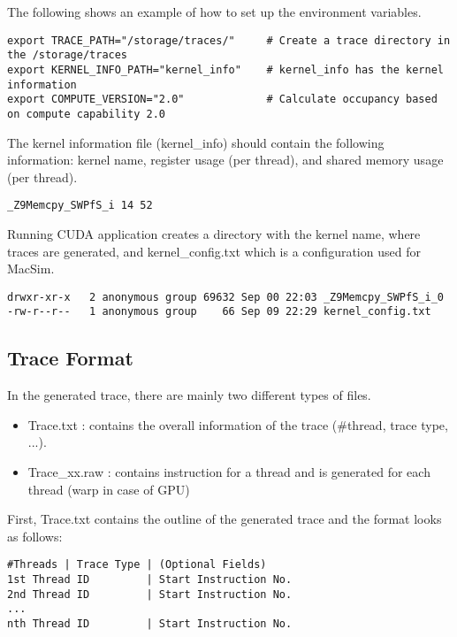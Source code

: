 The following shows an example of how to set up the environment variables.

\smallskip
\begin{lstlisting}
export TRACE_PATH="/storage/traces/"     # Create a trace directory in the /storage/traces
export KERNEL_INFO_PATH="kernel_info"    # kernel_info has the kernel information
export COMPUTE_VERSION="2.0"             # Calculate occupancy based on compute capability 2.0
\end{lstlisting}
\smallskip

The kernel information file (kernel\_info) should contain the following
information: kernel name, register usage (per thread), and shared memory usage
(per thread).

\smallskip
\begin{lstlisting}
_Z9Memcpy_SWPfS_i 14 52 
\end{lstlisting}
\smallskip

Running CUDA application creates a directory with the kernel name, where traces 
are generated, and kernel\_config.txt which is a configuration used for MacSim.

\smallskip
\begin{lstlisting}
drwxr-xr-x   2 anonymous group 69632 Sep 00 22:03 _Z9Memcpy_SWPfS_i_0
-rw-r--r--   1 anonymous group    66 Sep 09 22:29 kernel_config.txt
\end{lstlisting}
\smallskip


\subsection{Trace Format}
\label{sec:traceformat}

In the generated trace, there are mainly two different types of files.
\begin{itemize}\itemsep2pt
\item Trace.txt : contains the overall information of the trace (\#thread, trace type, ...).
\item Trace\_xx.raw : contains instruction for a thread and is generated for each thread (warp in case of GPU)
\end{itemize}

First, Trace.txt contains the outline of the generated trace and the format looks as follows: 
\smallskip
\begin{lstlisting}
#Threads | Trace Type | (Optional Fields)
1st Thread ID         | Start Instruction No.
2nd Thread ID         | Start Instruction No.
...
nth Thread ID         | Start Instruction No.
\end{lstlisting}
\smallskip

